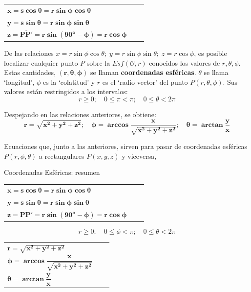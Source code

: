 \begin{table}[H]
\centering
\begin{tabular}{lll}
$ \boldsymbol{x=s\cos \theta = r \sin \phi \cos \theta} $ \\
$ \boldsymbol{y=s \sin \theta = r \sin \phi \sin \theta} $ \\
$ \boldsymbol{z=\overline{PP'}=r \sin (90^o-\phi)= r \cos \phi} $  
\end{tabular}
\end{table}

De las relaciones $x=r \sin \phi \cos \theta;\; y=r \sin \phi \sin \theta;\; z=r \cos \phi$, es posible localizar cualquier punto $P$ sobre la $Esf(\mathcal O,r)$ conocidos los valores de $r, \theta, \phi$. Estas cantidades, $\boldsymbol{(r, \theta, \phi)}$ se llaman \textbf{coordenadas esféricas}. $\theta$ se llama `longitud', $\phi$ es la `colatitud' y $r$ es el `radio vector' del punto $P(r, \theta, \phi)$. Sus valores están restringidos a los intervalos:
$$r\ge 0;\quad 0\le \pi < \pi;\quad 0\le \theta <2\pi$$

Despejando en las relaciones anteriores, se obtiene:
$$\boldsymbol{ r=\sqrt{x^2+y^2+z^2};\quad \phi=\arccos \dfrac {x}{\sqrt{x^2+y^2+z^2}}; \quad \theta= \arctan
 \dfrac y x }$$
 
 Ecuaciones que, junto a las anteriores, sirven para pasar de coordenadas esféricas $P(r, \phi, \theta)$ a rectangulares $P(x,y,z)$ y viceversa,

\vspace{10mm} %
\begin{myblock}{Coordenadas Esféricas: resumen}

\begin{table}[H]
\centering
\begin{tabular}{lll}
$ \boldsymbol{x=s\cos \theta = r \sin \phi \cos \theta} $ \\
$ \boldsymbol{y=s \sin \theta = r \sin \phi \sin \theta} $ \\
$ \boldsymbol{z=\overline{PP'}=r \sin (90^o-\phi)= r \cos \phi} $  
\end{tabular}
\end{table}

\vspace{-5mm}$$r\ge 0;\quad 0\le \phi < \pi;\quad 0\le \theta <2\pi$$

\begin{table}[H]
\centering
\begin{tabular}{lll}
$\boldsymbol{ r=\sqrt{x^2+y^2+z^2} }$ \\
$\boldsymbol{ \phi=\arccos \dfrac {x}{\sqrt{x^2+y^2+z^2}} }$ \\
$\boldsymbol{ \theta= \arctan \dfrac y x }$ 
\end{tabular}
\end{table}
\end{myblock}

